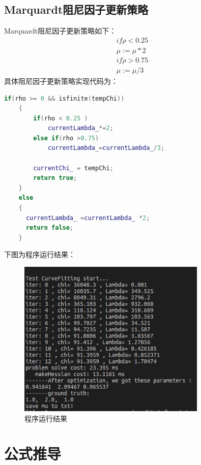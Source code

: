 \documentclass[UTF8]{ctexart}
\begin{document}
\subsection{Marquardt阻尼因子更新策略}
\indent Marquardt阻尼因子更新策略如下：
\begin{equation}\nonumber
\begin{aligned}
    if \rho < 0.25 \\
    \mu := \mu*2\\
    if \rho > 0.75\\
    \mu :=\mu/3
\end{aligned}
\end{equation}
\indent 具体阻尼因子更新策略实现代码为：
\begin{lstlisting}[language={c++}]
    if(rho >= 0 && isfinite(tempChi))
    {
        if(rho < 0.25 )
            currentLambda_*=2;
        else if(rho >0.75)
            currentLambda_=currentLambda_/3;

        currentChi_ = tempChi;
        return true;
    }
    else 
    {
      currentLambda_ =currentLambda_ *2;
      return false;   
    }
\end{lstlisting}
\indent 下图为程序运行结果：\\
\begin{figure}[H]
\centering
\includegraphics[width=0.8\textwidth]{mu2.jpg}    
\caption{程序运行结果}
\label{imga}
\end{figure}

\section{公式推导}
\end{document}

